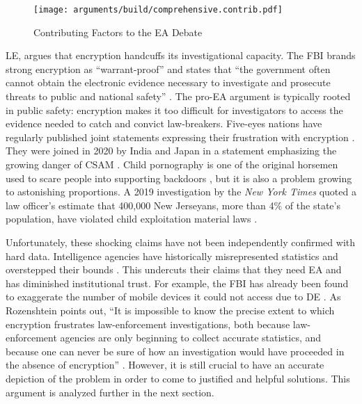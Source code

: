 \begin{sidewaysfigure}
  \centering\CaptionFontSize
  \texttt{[image: arguments/build/comprehensive.contrib.pdf]}
  \caption{Contributing Factors to the EA Debate}
  \label{fig-args-contrib}
\end{sidewaysfigure}

\Acl{LE}, argues that encryption handcuffs its investigational capacity. The \ac{FBI} brands strong encryption as
``warrant-proof'' and states that ``the government often cannot obtain the electronic evidence necessary to investigate
and prosecute threats to public and national safety'' \cite{fbi_2020}. The pro-\ac{EA} argument is typically rooted in
public safety: encryption makes it too difficult for investigators to access the evidence needed to catch and convict
law-breakers. Five-eyes nations have regularly published joint statements expressing their frustration with encryption
\cite{ministerial_2018} \cite{goodale_2017}. They were joined in 2020 by India and Japan in a statement emphasizing the
growing danger of \ac{CSAM} \cite{intl_2020}. Child pornography is one of the original \ac{horsemen} used to scare
people into supporting backdoors \cite{schneier_scaring_2019}, but it is also a problem growing to astonishing
proportions. A 2019 investigation by the \textit{New York Times} quoted a law officer's estimate that 400,000 New
Jerseyans, more than 4\% of the state's population, have violated child exploitation material laws
\cite{keller_internet_2019}.

Unfortunately, these shocking claims have not been independently confirmed with hard data. Intelligence agencies have
historically misrepresented statistics and overstepped their bounds \cite{johnson_congressional_2004}
\cite{shamsi_2011}. This undercuts their claims that they need \ac{EA} and has diminished institutional trust. For
example, the \ac{FBI} has already been found to exaggerate the number of mobile devices it could not access due to
\acl{DE} \cite{devlin_2018}. As Rozenshtein points out, ``It is impossible to know the precise extent to which
encryption frustrates law-enforcement investigations, both because law-enforcement agencies are only beginning to
collect accurate statistics, and because one can never be sure of how an investigation would have proceeded in the
absence of encryption'' \cite{rozenshtein_wicked_2018}. However, it is still crucial to have an accurate depiction of
the problem in order to come to justified and helpful solutions. This argument is analyzed further in the next section.

